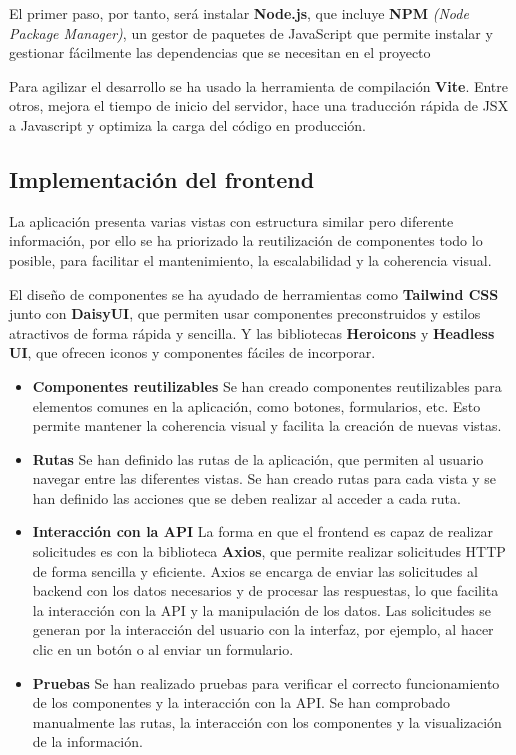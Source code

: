 El primer paso, por tanto, será instalar \textbf{Node.js}, que incluye \textbf{NPM} \textit{(Node Package Manager)}, un gestor de paquetes de JavaScript que permite instalar y gestionar  fácilmente las dependencias que se necesitan en el proyecto

Para agilizar el desarrollo se ha usado la herramienta de compilación \textbf{Vite}. Entre otros, mejora el tiempo de inicio del servidor, hace una traducción rápida de JSX a Javascript y optimiza la carga del código en producción.

\subsection{Implementación del frontend}
La aplicación presenta varias vistas con estructura similar pero diferente información, por ello se ha priorizado la reutilización de componentes todo lo posible, para facilitar el mantenimiento, la escalabilidad y la coherencia visual.

El diseño de componentes se ha ayudado de herramientas como \textbf{Tailwind CSS} junto con \textbf{DaisyUI}, que permiten usar componentes preconstruidos y estilos atractivos de forma rápida y sencilla. Y las bibliotecas \textbf{Heroicons} y \textbf{Headless UI}, que ofrecen iconos y componentes fáciles de incorporar.


\begin{itemize}
    \item \textbf{Componentes reutilizables}
        Se han creado componentes reutilizables para elementos comunes en la aplicación, como botones, formularios, etc. Esto permite mantener la coherencia visual y facilita la creación de nuevas vistas.
    \item \textbf{Rutas}
        Se han definido las rutas de la aplicación, que permiten al usuario navegar entre las diferentes vistas. Se han creado rutas para cada vista y se han definido las acciones que se deben realizar al acceder a cada ruta.
    \item \textbf{Interacción con la API}
        La forma en que el frontend es capaz de realizar solicitudes es con la biblioteca \textbf{Axios}, que permite realizar solicitudes HTTP de forma sencilla y eficiente. Axios se encarga de enviar las solicitudes al backend con los datos necesarios y de procesar las respuestas, lo que facilita la interacción con la API y la manipulación de los datos. Las solicitudes se generan por la interacción del usuario con la interfaz, por ejemplo, al hacer clic en un botón o al enviar un formulario.
    \item \textbf{Pruebas}
        Se han realizado pruebas para verificar el correcto funcionamiento de los componentes y la interacción con la API. Se han comprobado manualmente las rutas, la interacción con los componentes y la visualización de la información.
\end{itemize}


